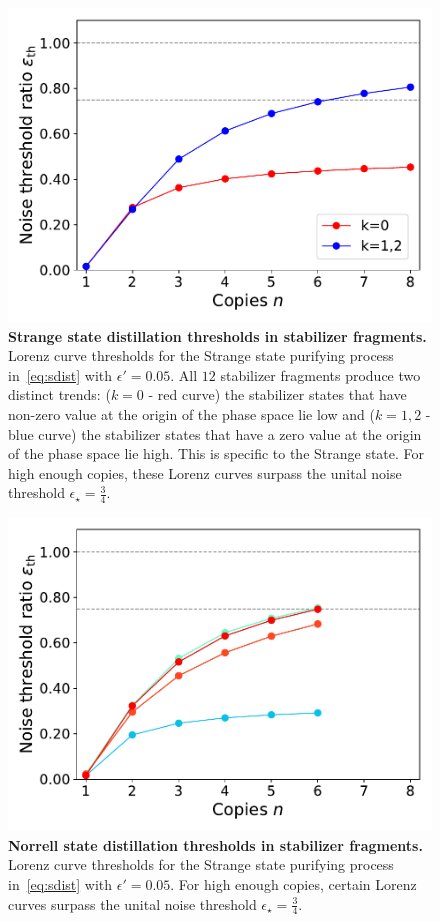 \documentclass[pra,
aps,
twocolumn,
superscriptaddress,
groupedaddress,
nofootinbib,
reprint
]{revtex4-1}
\begin{document}
\begin{figure}[h]
    \centering
    \includegraphics[scale=0.5]{figs/stab_distill.pdf}
    \caption{\textbf{Strange state distillation thresholds in stabilizer fragments.} Lorenz curve thresholds for the Strange state purifying process in~\cref{eq:sdist} with $\epsilon' = 0.05$.
    All $12$ stabilizer fragments produce two distinct trends: ($k=0$ - red curve) the stabilizer states that have non-zero value at the origin of the phase space lie low and ($k=1,2$ - blue curve) the stabilizer states that have a zero value at the origin of the phase space lie high.
    This is specific to the Strange state.
    For high enough copies, these Lorenz curves surpass the unital noise threshold $\epsilon_{\star} = \frac{3}{4}$.
    }
    \label{fig:stab_distill}
\end{figure}

\begin{figure}[h]
    \centering
    \includegraphics[scale=0.5]{figs/stab_distill_norrell.pdf}
    \caption{\textbf{Norrell state distillation thresholds in stabilizer fragments.} Lorenz curve thresholds for the Strange state purifying process in~\cref{eq:sdist} with $\epsilon' = 0.05$.
    For high enough copies, certain Lorenz curves surpass the unital noise threshold $\epsilon_{\star} = \frac{3}{4}$.
    }
    \label{fig:stab_distill_norrell}
\end{figure}
\end{document}
